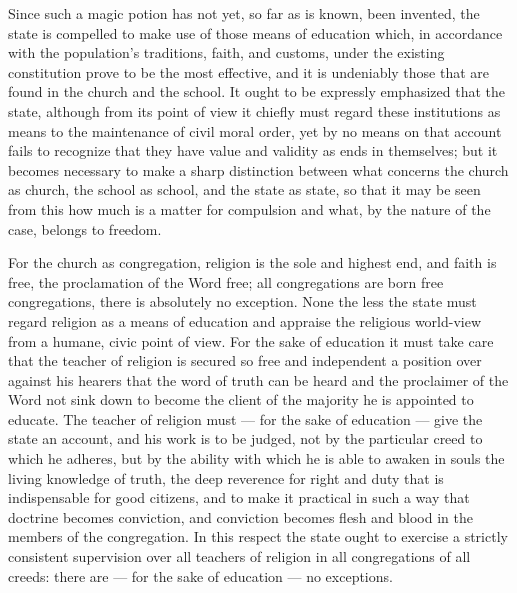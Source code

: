 \documentclass[12pt,a4paper,openany]{book}
\newcommand{\opage}[1]{\marginnote{\footnotesize\textit{[#1]}}}
\begin{document}
Since such a magic potion has not yet, so far as is known, been
invented, the state is compelled to make use of those means of education
which, in accordance with the population's
traditions, faith, and customs, under the existing constitution
prove to be the most effective, and it is undeniably
those that are found in the church and the school. It ought to be expressly
emphasized that the state, although from its point of view it chiefly
must regard these institutions as means
to the maintenance of civil moral order, yet by no means on that account
fails to recognize that they have value and validity
as ends in themselves; but it becomes necessary to
make a sharp distinction between what concerns
the church as church, the school as school, and the state as state,
so that it may be seen from this how much is a matter for
compulsion and what, by the nature of the case, belongs to freedom.

\setcounter{footnote}{0}%
\opage{4}For the church as congregation, religion is the sole and
highest end, and faith is free, the proclamation of the Word free;
all congregations are born free congregations, there is absolutely
no exception. None the less the state must regard
religion as a means of education and appraise the
religious world-view from a humane, civic
point of view. For the sake of education it must take care
that the teacher of religion is secured so free and
independent a position over against his hearers that the word of truth
can be heard and the proclaimer of the Word not sink down
to become the client of the majority he is appointed to educate.
The teacher of religion must --- for the sake of education ---
give the state an account, and his work is to be judged, not
by the particular creed to which he adheres,
but by the ability with which he is able to awaken
in souls the living knowledge of truth, the deep reverence
for right and duty that is indispensable for good citizens,
and to make it practical in such a way that
doctrine becomes conviction, and conviction becomes
flesh and blood in the members of the congregation. In
this respect the state ought to exercise a strictly consistent supervision
over all teachers of religion in all congregations of all creeds:
there are --- for the sake of education ---
no exceptions.
\end{document}

